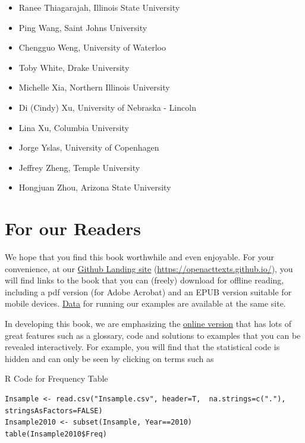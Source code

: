 \documentclass[]{book}
\theoremstyle{definition}
\theoremstyle{definition}
\theoremstyle{definition}
\theoremstyle{remark}
\begin{document}
\begin{itemize}
\item
  Ranee Thiagarajah, Illinois State University
\item
  Ping Wang, Saint Johns University
\item
  Chengguo Weng, University of Waterloo
\item
  Toby White, Drake University
\item
  Michelle Xia, Northern Illinois University
\item
  Di (Cindy) Xu, University of Nebraska - Lincoln
\item
  Lina Xu, Columbia University
\item
  Jorge Yslas, University of Copenhagen
\item
  Jeffrey Zheng, Temple University
\item
  Hongjuan Zhou, Arizona State University
\end{itemize}

\section*{For our Readers}\label{for-our-readers}

We hope that you find this book worthwhile and even enjoyable. For your
convenience, at our \href{https://openacttexts.github.io/}{Github
Landing site} (\url{https://openacttexts.github.io/}), you will find
links to the book that you can (freely) download for offline reading,
including a pdf version (for Adobe Acrobat) and an EPUB version suitable
for mobile devices.
\href{https://github.com/OpenActTexts/Loss-Data-Analytics/tree/master/Data}{Data}
for running our examples are available at the same site.

In developing this book, we are emphasizing the
\href{https://openacttexts.github.io/Loss-Data-Analytics/index.html}{online
version} that has lots of great features such as a glossary, code and
solutions to examples that you can be revealed interactively. For
example, you will find that the statistical code is hidden and can only
be seen by clicking on terms such as

R Code for Frequency Table

\hypertarget{display.T:Frequency.2Intro}{}
\begin{verbatim}
Insample <- read.csv("Insample.csv", header=T,  na.strings=c("."), stringsAsFactors=FALSE)
Insample2010 <- subset(Insample, Year==2010)
table(Insample2010$Freq)
\end{verbatim}
\end{document}
